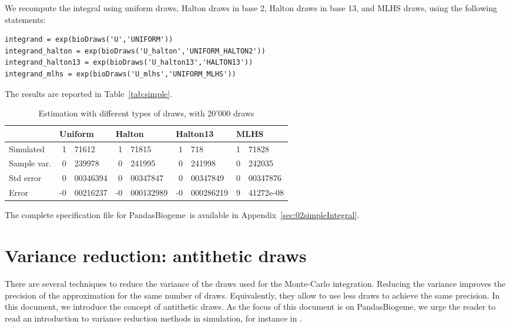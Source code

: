 \documentclass[12pt,a4paper]{article}
\newcommand{\PBIOGEME}{PandasBiogeme}
\begin{document}
We recompute the integral using uniform draws, Halton draws in base 2,
Halton draws in base 13, and MLHS draws, using the following statements:
\begin{lstlisting}
integrand = exp(bioDraws('U','UNIFORM'))
integrand_halton = exp(bioDraws('U_halton','UNIFORM_HALTON2'))
integrand_halton13 = exp(bioDraws('U_halton13','HALTON13'))
integrand_mlhs = exp(bioDraws('U_mlhs','UNIFORM_MLHS'))
\end{lstlisting}

The results are reported in Table~\vref{tab:simple}.

\begin{table}[htb]
  \begin{center}
    \begin{tabular}{l|r@{.}lr@{.}lr@{.}lr@{.}l}
	&	\multicolumn{2}{l}{Uniform} &
      \multicolumn{2}{l}{Halton} &
      \multicolumn{2}{l}{Halton13} & \multicolumn{2}{l}{MLHS} \\
      \hline
Simulated &	1&71612 &	1&71815 &	1&718 &	1&71828 \\
Sample var. &	0&239978 &	0&241995 &	0&241998 &
0&242035 \\
Std error &	0&00346394 &	0&00347847 &	0&00347849 &
0&00347876 \\
Error	&	-0&00216237 &	-0&000132989 &	-0&000286219 &
9&41272e-08
    \end{tabular}
  \end{center}
  \caption{\label{tab:simple}Estimation with different types of draws,
  with 20'000 draws}
\end{table}

The complete specification file for \PBIOGEME\ is available in Appendix~\ref{sec:02simpleIntegral}.

\section{Variance reduction: antithetic draws}

There are several techniques to reduce the variance of the draws used
for the Monte-Carlo integration. Reducing the variance improves the
precision of the approximation for the same number of
draws. Equivalently, they allow to use less draws to achieve the same
precision. In this document, we introduce the concept of antithetic
draws. As the focus of this document is on
\PBIOGEME, we urge the reader to read an introduction to variance
reduction methods in simulation, for instance in .
\end{document}
